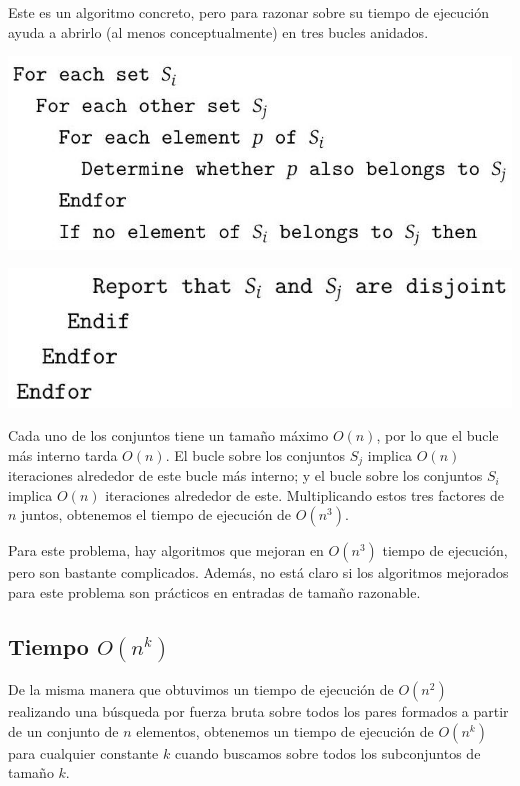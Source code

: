 \documentclass[a4paper, 12pt]{book}
\theoremstyle{dotless}
\begin{document}
Este es un algoritmo concreto, pero para razonar sobre su tiempo de ejecución ayuda a abrirlo (al menos conceptualmente) en tres bucles anidados.

\begin{center}
\includegraphics[width=\textwidth]{./Imagenes-Seccion2/2023_08_07_379b6f7f3185549667e3g-06(2)}
\end{center}

\begin{center}
\includegraphics[width=\textwidth]{./Imagenes-Seccion2/2023_08_07_379b6f7f3185549667e3g-07}
\end{center}

Cada uno de los conjuntos tiene un tamaño máximo $O(n)$, por lo que el bucle más interno tarda $O(n)$. El bucle sobre los conjuntos $S_{j}$ implica $O(n)$ iteraciones alrededor de este bucle más interno; y el bucle sobre los conjuntos $S_{i}$ implica $O(n)$ iteraciones alrededor de este. Multiplicando estos tres factores de $n$ juntos, obtenemos el tiempo de ejecución de $O\left(n^{3}\right)$.

Para este problema, hay algoritmos que mejoran en $ O\left(n^{3}\right)$ tiempo de ejecución, pero son bastante complicados. Además, no está claro si los algoritmos mejorados para este problema son prácticos en entradas de tamaño razonable.

\subsection*{Tiempo $O\left(n^{k}\right)$ }
De la misma manera que obtuvimos un tiempo de ejecución de $O\left(n^{2}\right)$ realizando una búsqueda por fuerza bruta sobre todos los pares formados a partir de un conjunto de $n$ elementos, obtenemos un tiempo de ejecución de $O\left(n^{k}\right)$ para cualquier constante $k$ cuando buscamos sobre todos los subconjuntos de tamaño $k$.
\end{document}
